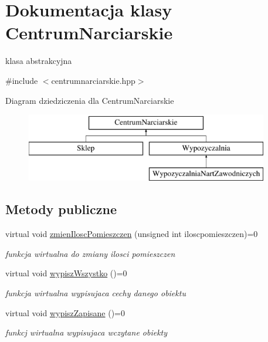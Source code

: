\hypertarget{class_centrum_narciarskie}{}\section{Dokumentacja klasy Centrum\+Narciarskie}
\label{class_centrum_narciarskie}


klasa abstrakcyjna  




{\ttfamily \#include $<$centrumnarciarskie.\+hpp$>$}

Diagram dziedziczenia dla Centrum\+Narciarskie\begin{figure}[H]
\begin{center}
\leavevmode
\includegraphics[height=3.000000cm]{class_centrum_narciarskie}
\end{center}
\end{figure}
\subsection*{Metody publiczne}
\begin{DoxyCompactItemize}
\item 
\mbox{\label{class_centrum_narciarskie_aa355c508b58fddb6b3bcaed4c25b48ef}} 
virtual void \hyperlink{class_centrum_narciarskie_aa355c508b58fddb6b3bcaed4c25b48ef}{zmien\+Ilosc\+Pomieszczen} (unsigned int iloscpomieszczen)=0
\begin{DoxyCompactList}\small\item\em funkcja wirtualna do zmiany ilosci pomieszczen \end{DoxyCompactList}\item 
\mbox{\label{class_centrum_narciarskie_a15784c30d71940ca8175ec08017c5cef}} 
virtual void \hyperlink{class_centrum_narciarskie_a15784c30d71940ca8175ec08017c5cef}{wypisz\+Wszystko} ()=0
\begin{DoxyCompactList}\small\item\em funkcja wirtualna wypisujaca cechy danego obiektu \end{DoxyCompactList}\item 
\mbox{\label{class_centrum_narciarskie_a75c413e012897e7c1c4b210403618e29}} 
virtual void \hyperlink{class_centrum_narciarskie_a75c413e012897e7c1c4b210403618e29}{wypisz\+Zapisane} ()=0
\begin{DoxyCompactList}\small\item\em funkcj wirtualna wypisujaca wczytane obiekty \end{DoxyCompactList}\end{DoxyCompactItemize}
